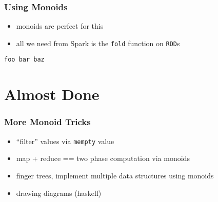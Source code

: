 \documentclass{beamer}
\begin{document}
\begin{frame}[fragile]
  \frametitle{Using Monoids}
  \begin{itemize}
  \item monoids are perfect for this
  \item all we need from Spark is the \texttt{fold} function on \texttt{RDD}s
  \end{itemize}
\begin{verbatim}
foo bar baz
\end{verbatim}
\end{frame}


\section{Almost Done}

\begin{frame}
  \frametitle{More Monoid Tricks}
  \begin{itemize}
  \item ``filter'' values via \texttt{mempty} value
  \item map + reduce == two phase computation via monoids
  \item finger trees, implement multiple data structures using monoids
  \item drawing diagrams (haskell)
  \end{itemize}
\end{frame}
\end{document}
